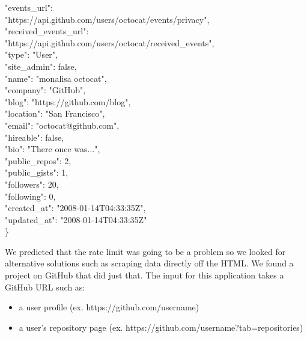 \documentclass[11pt]{article}
\begin{document}
\begin{itemize}
\begin{itemize}
{{			  \textcolor{r}{"events\_url"}: \\\textcolor{b}{"https://api.github.com/users/octocat/events{/privacy}"},\\
			  \textcolor{r}{"received\_events\_url"}: \\\textcolor{b}{"https://api.github.com/users/octocat/received\_events"},\\
			  \textcolor{r}{"type"}: \textcolor{b}{"User"},\\
			  \textcolor{r}{"site\_admin"}: \textcolor{b}{false},\\
			  \textcolor{r}{"name"}: \textcolor{b}{"monalisa octocat"},\\
			  \textcolor{r}{"company"}: \textcolor{b}{"GitHub"},\\
			  \textcolor{r}{"blog"}: \textcolor{b}{"https://github.com/blog"},\\
			  \textcolor{r}{"location"}: \textcolor{b}{"San Francisco"},\\
			  \textcolor{r}{"email"}: \textcolor{b}{"octocat@github.com"},\\
			  \textcolor{r}{"hireable"}: \textcolor{b}{false},\\
			  \textcolor{r}{"bio"}: \textcolor{b}{"There once was..."},\\
			  \textcolor{r}{"public\_repos"}: \textcolor{b}{2},\\
			  \textcolor{r}{"public\_gists"}: \textcolor{b}{1},\\
			  \textcolor{r}{"followers"}: \textcolor{b}{20},\\
			  \textcolor{r}{"following"}: \textcolor{b}{0},\\
			  \textcolor{r}{"created\_at"}: \textcolor{b}{"2008-01-14T04:33:35Z"},\\
			  \textcolor{r}{"updated\_at"}: "\textcolor{b}{2008-01-14T04:33:35Z"}\\
			}
		\}\\
   	   }
	\end{itemize}
\end{itemize}

We predicted that the rate limit was going to be a problem so we looked for alternative solutions such as scraping data directly off the HTML. We found a project on GitHub that did just that. The input for this application takes a GitHub URL such as:
\begin{itemize}
\item{a user profile (ex. https://github.com/username)}
\item{a user's repository page (ex. https://github.com/username?tab=repositories)}
\end{itemize}
\end{document}

